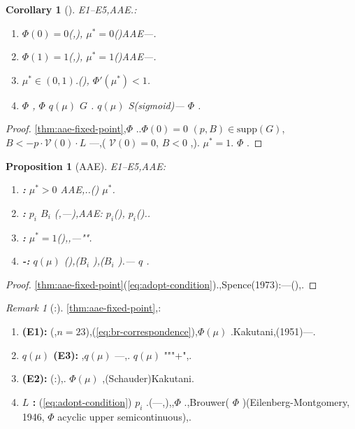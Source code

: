 \documentclass[12pt,a4paper]{article}
\newtheorem{corollary}[theorem]{Corollary}
\newtheorem{proposition}[theorem]{Proposition}
\theoremstyle{definition}
\theoremstyle{remark}
\newtheorem{remark}{Remark}[section]
\begin{document}
\begin{corollary}[]
\label{cor:multiple-aae}
E1--E5,AAE.:
\begin{enumerate}[label=(\roman*)]
\item  $\Phi(0) = 0$(,), $\mu^* = 0$()AAE---.
\item  $\Phi(1) = 1$(,), $\mu^* = 1$()AAE---.
\item  $\mu^* \in (0,1)$.(), $\Phi'(\mu^*) < 1$.
\item  $\Phi$ , $\Phi$  $q(\mu)$  $G$ . $q(\mu)$ S(sigmoid)--- $\Phi$ .
\end{enumerate}
\end{corollary}

\begin{proof}
\ref{thm:aae-fixed-point},$\Phi$ ..$\Phi(0) = 0$  $(p, B) \in \text{supp}(G)$,$B < -p \cdot \mathcal{V}(0) \cdot L$ ---,( $\mathcal{V}(0) = 0$, $B < 0$ ,). $\mu^* = 1$. $\Phi$ .
\end{proof}

\begin{proposition}[AAE]
\label{prop:aae-welfare}
E1--E5,AAE:
\begin{enumerate}[label=(\roman*)]
\item \textbf{:}  $\mu^* > 0$ AAE,..() $\mu^*$.
\item \textbf{:}  $p_i$  $B_i$ (,---),AAE\textit{}: $p_i$(), $p_i$()..
\item \textbf{:}  $\mu^* = 1$(),,---"".
\item \textbf{-:}  $q(\mu)$ (),($B_i$ ),($B_i$ ).\textit{}--- $q$ .
\end{enumerate}
\end{proposition}

\begin{proof}
\ref{thm:aae-fixed-point}(\ref{eq:adopt-condition}).,Spence(1973):---(),.
\end{proof}

\begin{remark}[:]
\ref{thm:aae-fixed-point},:
\begin{enumerate}[label=(\arabic*), leftmargin=*]
\item \textbf{(E1):} (,$n = 2$$3$),(\ref{eq:br-correspondence}),$\Phi(\mu)$ .Kakutani,(1951)---.
\item \textbf{ $q(\mu)$ (E3):} ,$q(\mu)$ ---,. $q(\mu)$ """+",.
\item \textbf{(E2):} (:),. $\Phi(\mu)$ ,(Schauder)Kakutani.
\item \textbf{ $L$ :} (\ref{eq:adopt-condition}) $p_i$ .(---,),,$\Phi$ .,Brouwer( $\Phi$ )(Eilenberg-Montgomery, 1946, $\Phi$ acyclic upper semicontinuous),.
\end{enumerate}
\end{remark}
\end{document}
